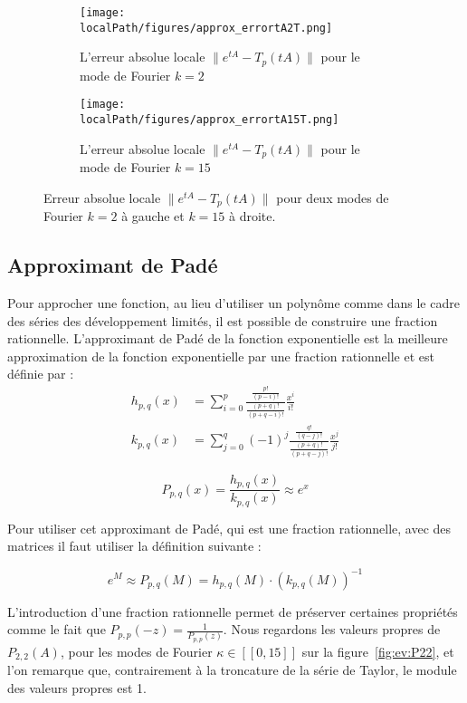 \begin{figure}
  \begin{subfigure}{.5\textwidth}
    \centering
    \texttt{[image: \\localPath/figures/approx\_errortA2T.png]}
    \caption{L'erreur absolue locale $\|e^{tA}-T_p(tA)\|$ pour le mode de Fourier $k=2$}
  \end{subfigure}
  \begin{subfigure}{.5\textwidth}
    \centering
    \texttt{[image: \\localPath/figures/approx\_errortA15T.png]}
    \caption{L'erreur absolue locale $\|e^{tA}-T_p(tA)\|$ pour le mode de Fourier $k=15$}
  \end{subfigure}
  \caption{Erreur absolue locale $\|e^{tA}-T_p(tA)\|$ pour deux modes de Fourier $k=2$ à gauche et $k=15$ à droite.}
  \label{fig:taylor:error}
\end{figure}

\subsection{Approximant de Padé}

Pour approcher une fonction, au lieu d'utiliser un polynôme comme dans le cadre des séries des développement limités, il est possible de construire une fraction rationnelle. L'approximant de Padé de la fonction exponentielle est la meilleure approximation de la fonction exponentielle par une fraction rationnelle et est définie par :
$$
  \begin{aligned}
    h_{p,q}(x) &= \sum_{i=0}^p \frac{\frac{p!}{(p-i)!}}{\frac{(p+q)!}{(p+q-i)!}}\frac{x^i}{i!} \\
    k_{p,q}(x) &= \sum_{j=0}^q (-1)^j \frac{\frac{q!}{(q-j)!}}{\frac{(p+q)!}{(p+q-j)!}} \frac{x^j}{j!}
  \end{aligned}
$$

$$
  P_{p,q}(x) = \frac{h_{p,q}(x)}{k_{p,q}(x)} \approx e^x
$$

Pour utiliser cet approximant de Padé, qui est une fraction rationnelle, avec des matrices il faut utiliser la définition suivante :

$$
  e^M \approx P_{p,q}(M) = h_{p,q}(M)\cdot\left(k_{p,q}(M)\right)^{-1}
$$

L'introduction d'une fraction rationnelle permet de préserver certaines propriétés comme le fait que $P_{p,p}(-z) = \frac{1}{P_{p,p}(z)}$. Nous regardons les valeurs propres de $P_{2,2}(A)$, pour les modes de Fourier $\kappa\in[\![0,15]\!]$ sur la figure~\ref{fig:ev:P22}, et l'on remarque que, contrairement à la troncature de la série de Taylor, le module des valeurs propres est 1.

